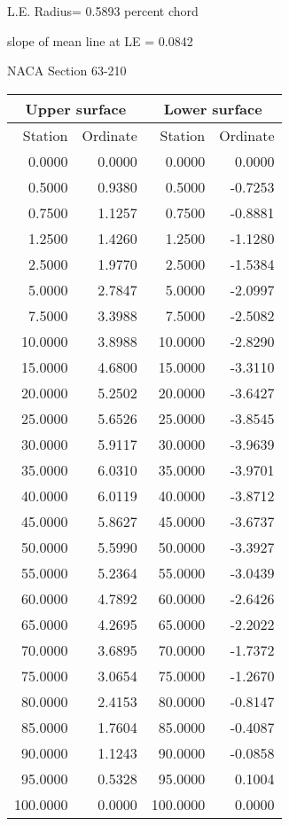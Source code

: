 \documentclass[11pt]{book}
\begin{document}
L.E. Radius=  0.5893 percent chord


 slope of mean line at LE =  0.0842
 \newpage
  \label{s63-210}
 \begin{Large}
 NACA Section 63-210
 \end{Large}
  
 \vspace{8mm}
 \begin{tabular}{|r|r|r|r|} \hline 
 \multicolumn{2}{|c|}{Upper surface} & \multicolumn{2}{|c|}{Lower surface} \\
 \hline
 Station & Ordinate & Station & Ordinate \\
 \hline
0.0000 & 0.0000 & 0.0000 & 0.0000 \\
0.5000 & 0.9380 & 0.5000 & -0.7253 \\
0.7500 & 1.1257 & 0.7500 & -0.8881 \\
1.2500 & 1.4260 & 1.2500 & -1.1280 \\
2.5000 & 1.9770 & 2.5000 & -1.5384 \\
5.0000 & 2.7847 & 5.0000 & -2.0997 \\
7.5000 & 3.3988 & 7.5000 & -2.5082 \\
10.0000 & 3.8988 & 10.0000 & -2.8290 \\
15.0000 & 4.6800 & 15.0000 & -3.3110 \\
20.0000 & 5.2502 & 20.0000 & -3.6427 \\
25.0000 & 5.6526 & 25.0000 & -3.8545 \\
30.0000 & 5.9117 & 30.0000 & -3.9639 \\
35.0000 & 6.0310 & 35.0000 & -3.9701 \\
40.0000 & 6.0119 & 40.0000 & -3.8712 \\
45.0000 & 5.8627 & 45.0000 & -3.6737 \\
50.0000 & 5.5990 & 50.0000 & -3.3927 \\
55.0000 & 5.2364 & 55.0000 & -3.0439 \\
60.0000 & 4.7892 & 60.0000 & -2.6426 \\
65.0000 & 4.2695 & 65.0000 & -2.2022 \\
70.0000 & 3.6895 & 70.0000 & -1.7372 \\
75.0000 & 3.0654 & 75.0000 & -1.2670 \\
80.0000 & 2.4153 & 80.0000 & -0.8147 \\
85.0000 & 1.7604 & 85.0000 & -0.4087 \\
90.0000 & 1.1243 & 90.0000 & -0.0858 \\
95.0000 & 0.5328 & 95.0000 & 0.1004 \\
100.0000 & 0.0000 & 100.0000 & 0.0000 \\
 \hline 
 \end{tabular}
\end{document}

